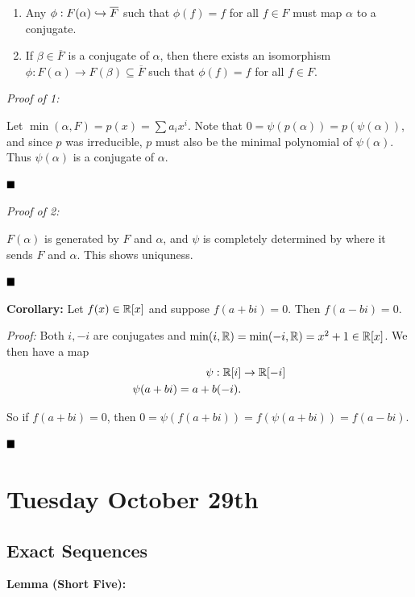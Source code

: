 \begin{enumerate}
\def\labelenumi{\arabic{enumi}.}
\item
  Any \(\phi: F(\alpha) \hookrightarrow \overline F\) such that \(\phi(f) = f\)
  for all \(f\in F\) must map \(\alpha\) to a conjugate.
\item
  If \(\beta \in \overline F\) is a conjugate of \(\alpha\), then there
  exists an isomorphism
  \(\phi: F(\alpha) \to F(\beta) \subseteq \overline F\) such that
  \(\phi(f) = f\) for all \(f\in F\).
\end{enumerate}

\emph{Proof of 1:}

Let \(\min(\alpha, F) = p(x) = \sum a_i x^i\). Note that
\(0 = \psi(p(\alpha)) = p(\psi(\alpha))\), and since \(p\) was
irreducible, \(p\) must also be the minimal polynomial of
\(\psi(\alpha)\). Thus \(\psi(\alpha)\) is a conjugate of \(\alpha\).

\(\qed\)

\emph{Proof of 2:}

\(F(\alpha)\) is generated by \(F\) and \(\alpha\), and \(\psi\) is
completely determined by where it sends \(F\) and \(\alpha\). This shows
uniquness.

\(\qed\)

\textbf{Corollary:} Let \(f(x) \in {\mathbb{R}}[x]\) and suppose \(f(a+bi)= 0\).
Then \(f(a-bi) = 0\).

\emph{Proof:} Both \(i, -i\) are conjugates and
\(\min(i, {\mathbb{R}}) = \min(-i, {\mathbb{R}}) = x^2 + 1 \in {\mathbb{R}}[x]\). We then have a
map \begin{align*}
\psi: {\mathbb{R}}[i] &\to {\mathbb{R}}[-i] \\
\psi(a+bi) = a + b(-i)
.\end{align*}

So if \(f(a+bi) = 0\), then
\(0 = \psi(f(a+bi)) = f(\psi(a+bi)) = f(a-bi)\).

\(\qed\)

\hypertarget{tuesday-october-29th}{%
\section{Tuesday October 29th}\label{tuesday-october-29th}}

\hypertarget{exact-sequences}{%
\subsection{Exact Sequences}\label{exact-sequences}}

\textbf{Lemma (Short Five):}


